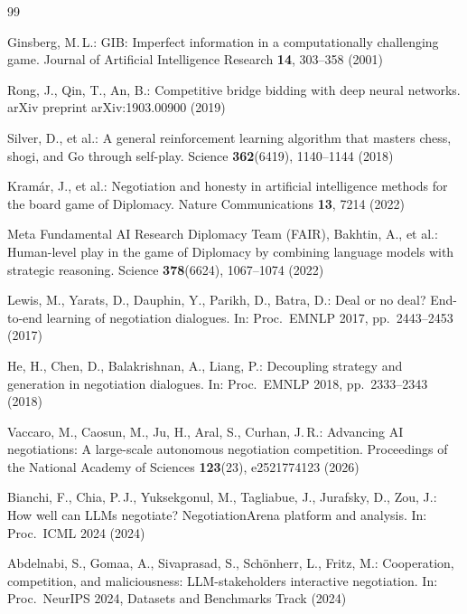 \documentclass[11pt,a4paper]{article}
\begin{document}
\begin{thebibliography}{99}\small

Ginsberg, M.\,L.:
GIB: Imperfect information in a computationally challenging game.
Journal of Artificial Intelligence Research \textbf{14}, 303--358 (2001)

Rong, J., Qin, T., An, B.:
Competitive bridge bidding with deep neural networks.
arXiv preprint arXiv:1903.00900 (2019)

Silver, D., et al.:
A general reinforcement learning algorithm that masters chess, shogi,
and Go through self-play.
Science \textbf{362}(6419), 1140--1144 (2018)

Kram\'ar, J., et al.:
Negotiation and honesty in artificial intelligence methods for the
board game of Diplomacy.
Nature Communications \textbf{13}, 7214 (2022)

Meta Fundamental AI Research Diplomacy Team (FAIR), Bakhtin, A., et al.:
Human-level play in the game of Diplomacy by combining language models
with strategic reasoning.
Science \textbf{378}(6624), 1067--1074 (2022)

Lewis, M., Yarats, D., Dauphin, Y., Parikh, D., Batra, D.:
Deal or no deal? End-to-end learning of negotiation dialogues.
In: Proc.\ EMNLP 2017, pp.~2443--2453 (2017)

He, H., Chen, D., Balakrishnan, A., Liang, P.:
Decoupling strategy and generation in negotiation dialogues.
In: Proc.\ EMNLP 2018, pp.~2333--2343 (2018)

Vaccaro, M., Caosun, M., Ju, H., Aral, S., Curhan, J.\,R.:
Advancing AI negotiations: A large-scale autonomous negotiation
competition.
Proceedings of the National Academy of Sciences \textbf{123}(23),
e2521774123 (2026)

Bianchi, F., Chia, P.\,J., Yuksekgonul, M., Tagliabue, J., Jurafsky, D.,
Zou, J.:
How well can LLMs negotiate? NegotiationArena platform and analysis.
In: Proc.\ ICML 2024 (2024)

Abdelnabi, S., Gomaa, A., Sivaprasad, S., Sch\"onherr, L., Fritz, M.:
Cooperation, competition, and maliciousness: LLM-stakeholders
interactive negotiation.
In: Proc.\ NeurIPS 2024, Datasets and Benchmarks Track (2024)


\end{thebibliography}
\end{document}
